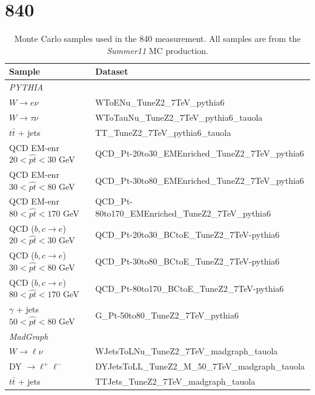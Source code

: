 \newpage
\section{\unit{840}{\invpb}}

\begin{table}[htbp]
\begin{center}
\small{
\begin{tabular}{ll}
\toprule
Sample & Dataset\\ %
\midrule
\multicolumn{2}{l}{\emph{PYTHIA}} \\ 
$W \rightarrow e \nu$
   & WToENu\_TuneZ2\_7TeV\_pythia6\\
$W \rightarrow \tau \nu$ 
   & WToTauNu\_TuneZ2\_7TeV\_pythia6\_tauola\\
$t\bar{t}$ + jets       
   & TT\_TuneZ2\_7TeV\_pythia6\_tauola\\
{QCD EM-enr}  $20<\hat{pt}<30$ GeV       
   & QCD\_Pt-20to30\_EMEnriched\_TuneZ2\_7TeV\_pythia6\\
{QCD EM-enr}  $30<\hat{pt}<80$  GeV     
   & QCD\_Pt-30to80\_EMEnriched\_TuneZ2\_7TeV\_pythia6\\
{QCD EM-enr}  $80<\hat{pt}<170$   GeV   
   & QCD\_Pt-80to170\_EMEnriched\_TuneZ2\_7TeV\_pythia6\\
{QCD ($b,c\rightarrow e$)}  $20<\hat{pt}<30$ GeV 
   & QCD\_Pt-20to30\_BCtoE\_TuneZ2\_7TeV-pythia6\\
{QCD ($b,c\rightarrow e$)}  $30<\hat{pt}<80$ GeV 
   & QCD\_Pt-30to80\_BCtoE\_TuneZ2\_7TeV-pythia6\\
{QCD ($b,c\rightarrow e$)}  $80<\hat{pt}<170$ GeV 
   & QCD\_Pt-80to170\_BCtoE\_TuneZ2\_7TeV-pythia6\\
{$\gamma$ + jets  } $50 <\hat{pt} < 80$ GeV       
   & G\_Pt-50to80\_TuneZ2\_7TeV\_pythia6\\
\multicolumn{2}{l}{\emph{MadGraph}} \\ 
$W \rightarrow \ell \nu$ 
   & WJetsToLNu\_TuneZ2\_7TeV\_madgraph\_tauola\\
DY $\rightarrow \ell^+\ell^-$	 
   & DYJetsToLL\_TuneZ2\_M\_50\_7TeV\_madgraph\_tauola\\
$t\bar{t}$ + jets        
   & TTJets\_TuneZ2\_7TeV\_madgraph\_tauola\\
\bottomrule
\end{tabular}
}
\caption[Monte Carlo samples used in the \unit{840}{\invpb} measurement. ]
{\label{tab:samples840}Monte Carlo samples used in the \unit{840}{\invpb}
measurement. All samples are from the \emph{Summer11} MC production. 
} 

\end{center}
\end{table}
